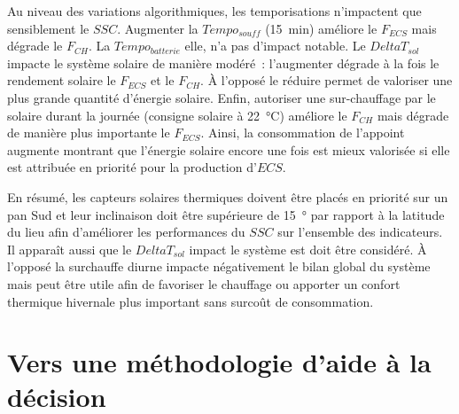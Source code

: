 Au niveau des variations algorithmiques, les temporisations n’impactent que sensiblement
le $SSC$. Augmenter la $Tempo_{souff}$ (\SI{15}{min}) améliore le $F_{ECS}$ mais dégrade le $F_{CH}$.
La $Tempo_{batterie}$ elle, n’a pas d’impact notable.
Le $DeltaT_{sol}$ impacte le système solaire de manière modéré~: l’augmenter dégrade
à la fois le rendement solaire le $F_{ECS}$ et le $F_{CH}$. À l’opposé le réduire
permet de valoriser une plus grande quantité d’énergie solaire. Enfin, autoriser une
sur-chauffage par le solaire durant la journée (consigne solaire à \SI{22}{\celsius})
améliore le $F_{CH}$ mais dégrade de manière plus importante le $F_{ECS}$. Ainsi,
la consommation de l’appoint augmente montrant que l’énergie solaire encore une
fois est mieux valorisée si elle est attribuée en priorité pour la production d’$ECS$.

En résumé, les capteurs solaires thermiques doivent être placés en priorité sur un
pan Sud et leur inclinaison doit être supérieure de \SI{15}{\degree} par rapport à
la latitude du lieu afin d’améliorer les performances du $SSC$ sur l’ensemble des indicateurs.
Il apparaît aussi que le $DeltaT_{sol}$ impact le système est doit être considéré. À l’opposé
la surchauffe diurne impacte négativement le bilan global du système mais peut être utile
afin de favoriser le chauffage ou apporter un confort thermique hivernale plus important
sans surcoût de consommation.





\section{Vers une méthodologie d’aide à la décision} %
\label{sec:vers_une_methodologie_d_aide_a_la_decision}


























